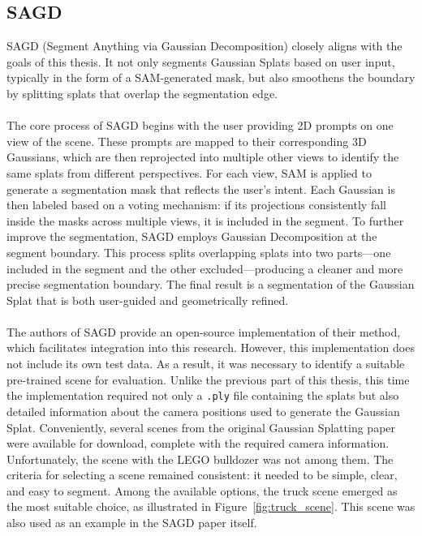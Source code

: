 \documentclass[12pt]{article}
\begin{document}
\subsection{SAGD}
SAGD (Segment Anything via Gaussian Decomposition) closely aligns with the goals of this thesis. It not only segments Gaussian Splats based on user input, typically in the form of a SAM-generated mask, but also smoothens the boundary by splitting splats that overlap the segmentation edge.
\\\\
The core process of SAGD begins with the user providing 2D prompts on one view of the scene. These prompts are mapped to their corresponding 3D Gaussians, which are then reprojected into multiple other views to identify the same splats from different perspectives. For each view, SAM is applied to generate a segmentation mask that reflects the user’s intent. Each Gaussian is then labeled based on a voting mechanism: if its projections consistently fall inside the masks across multiple views, it is included in the segment. To further improve the segmentation, SAGD employs Gaussian Decomposition at the segment boundary. This process splits overlapping splats into two parts—one included in the segment and the other excluded—producing a cleaner and more precise segmentation boundary. The final result is a segmentation of the Gaussian Splat that is both user-guided and geometrically refined.
\\\\
The authors of SAGD provide an open-source implementation of their method, which facilitates integration into this research. However, this implementation does not include its own test data. As a result, it was necessary to identify a suitable pre-trained scene for evaluation. Unlike the previous part of this thesis, this time the implementation required not only a \texttt{.ply} file containing the splats but also detailed information about the camera positions used to generate the Gaussian Splat. Conveniently, several scenes from the original Gaussian Splatting paper were available for download, complete with the required camera information. Unfortunately, the scene with the LEGO bulldozer was not among them. The criteria for selecting a scene remained consistent: it needed to be simple, clear, and easy to segment. Among the available options, the truck scene emerged as the most suitable choice, as illustrated in Figure~\ref{fig:truck_scene}. This scene was also used as an example in the SAGD paper itself.
\end{document}

